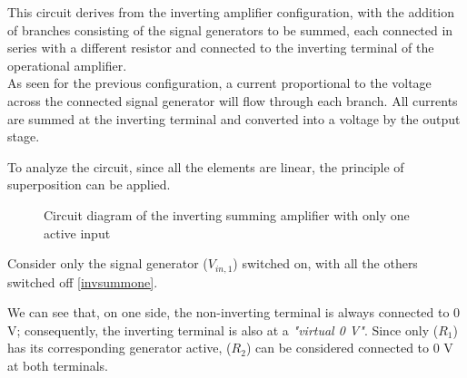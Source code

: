\documentclass[../main.tex]{subfiles}
\begin{document}
This circuit derives from the inverting amplifier configuration, with the addition of branches consisting of the signal generators to be summed, each connected in series with a different resistor and connected to the inverting terminal of the operational amplifier.\\ 

As seen for the previous configuration, a current proportional to the voltage across the connected signal generator will flow through each branch. All currents are summed at the inverting terminal and converted into a voltage by the output stage. 

To analyze the circuit, since all the elements are linear, the principle of superposition can be applied.

\begin{figure}[h!]
\begin{center}


\caption{Circuit diagram of the inverting summing amplifier with only one active input}
\label{invsummone}	
\end{center}	
\end{figure}

Consider only the signal generator ($V_{in,1}$) switched on, with all the others switched off \autoref{invsummone}. 

We can see that, on one side, the non-inverting terminal is always connected to 0 V; consequently, the inverting terminal is also at a \textit{"virtual 0 V"}. Since only ($R_1$) has its corresponding generator active, ($R_2$) can be considered connected to 0 V at both terminals.\\
\end{document}
